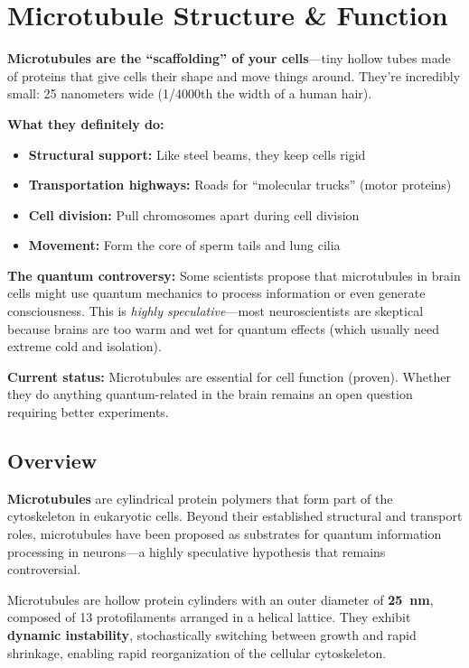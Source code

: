 \chapter{Microtubule Structure \& Function}
\label{ch:microtubule-structure-function}

\begin{nontechnical}
\textbf{Microtubules are the ``scaffolding'' of your cells}---tiny hollow tubes made of proteins that give cells their shape and move things around. They're incredibly small: 25 nanometers wide (1/4000th the width of a human hair).

\textbf{What they definitely do:}
\begin{itemize}
\item \textbf{Structural support:} Like steel beams, they keep cells rigid
\item \textbf{Transportation highways:} Roads for ``molecular trucks'' (motor proteins)
\item \textbf{Cell division:} Pull chromosomes apart during cell division
\item \textbf{Movement:} Form the core of sperm tails and lung cilia
\end{itemize}

\textbf{The quantum controversy:} Some scientists propose that microtubules in brain cells might use quantum mechanics to process information or even generate consciousness. This is \emph{highly speculative}---most neuroscientists are skeptical because brains are too warm and wet for quantum effects (which usually need extreme cold and isolation).

\textbf{Current status:} Microtubules are essential for cell function (proven). Whether they do anything quantum-related in the brain remains an open question requiring better experiments.
\end{nontechnical}

\section{Overview}
\label{sec:overview}

\textbf{Microtubules} are cylindrical protein polymers that form part of the cytoskeleton in eukaryotic cells. Beyond their established structural and transport roles, microtubules have been proposed as substrates for quantum information processing in neurons---a highly speculative hypothesis that remains controversial.

\begin{keyconcept}
Microtubules are hollow protein cylinders with an outer diameter of \textbf{25~nm}, composed of 13 protofilaments arranged in a helical lattice. They exhibit \textbf{dynamic instability}, stochastically switching between growth and rapid shrinkage, enabling rapid reorganization of the cellular cytoskeleton.
\end{keyconcept}

